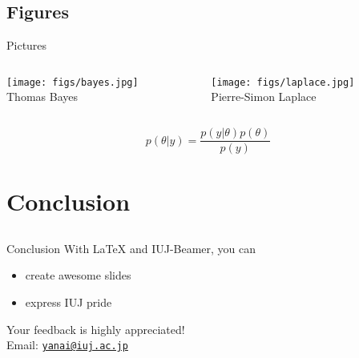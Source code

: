 \documentclass[dvipdfmx]{beamer}
\begin{document}
\subsection{Figures}

{
}


\begin{frame}{Pictures}
  \begin{columns}[t]
    \begin{column}{0.5\textwidth}
     \centering
     \texttt{[image: figs/bayes.jpg]}\\
     Thomas Bayes
   \end{column}
    \begin{column}{0.5\textwidth}
     \centering
     \texttt{[image: figs/laplace.jpg]}\\
     Pierre-Simon Laplace
   \end{column}
 \end{columns}
 \vspace{12pt}
 \[
  p(\theta | y) = \frac{p(y | \theta)p(\theta)}{p(y)}
 \]
\end{frame}


\section{Conclusion}
\subsection{}

\begin{frame}{Conclusion}
 With {\LaTeX} and IUJ-Beamer, you can
 \begin{itemize}
  \item create awesome slides
  \item express \alert{IUJ pride}
 \end{itemize}
 \pause
 \vspace{36pt}
 Your feedback is highly appreciated!\\
 \hspace{2em} Email: 
 \href{mailto:yanai@iuj.ac.jp}{\texttt{yanai@iuj.ac.jp}}
 \end{frame}
\end{document}
